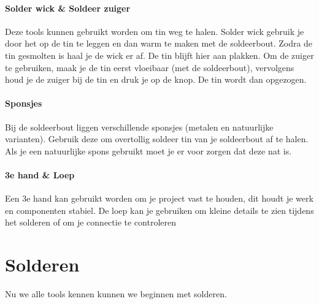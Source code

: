 \documentclass{guide}
\begin{document}
\paragraph{Solder wick \& Soldeer zuiger}
Deze tools kunnen gebruikt worden om tin weg te halen. Solder wick gebruik je door het op de tin te leggen en dan warm te maken met de soldeerbout. Zodra de tin gesmolten is haal je de wick er af. De tin blijft hier aan plakken. Om de zuiger te gebruiken, maak je de tin eerst vloeibaar (met de soldeerbout), vervolgens houd je de zuiger bij de tin en druk je op de knop. De tin wordt dan opgezogen.

\paragraph{Sponsjes}
Bij de soldeerbout liggen verschillende sponsjes (metalen en natuurlijke varianten). Gebruik deze om overtollig soldeer tin van je soldeerbout af te halen. Als je een natuurlijke spons gebruikt moet je er voor zorgen dat deze nat is.

\paragraph{3e hand \& Loep}
Een 3e hand kan gebruikt worden om je project vast te houden, dit houdt je werk en componenten stabiel. De loep kan je gebruiken om kleine details te zien tijdens het solderen of om je connectie te controleren

\newpage
\section{Solderen}
Nu we alle tools kennen kunnen we beginnen met solderen.\\
\end{document}
